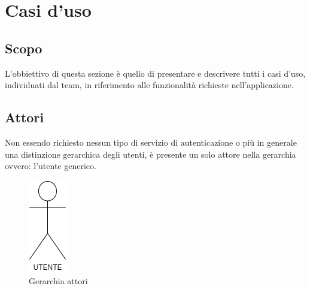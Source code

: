 
\section{Casi d'uso}
\subsection{Scopo}
L'obbiettivo di questa sezione è quello di presentare e descrivere tutti i casi d'uso, individuati dal team, in riferimento alle funzionalità richieste nell'applicazione.
\subsection{Attori}
Non essendo richiesto nessun tipo di servizio di autenticazione o più in generale una distinzione gerarchica degli utenti, è presente un solo attore nella gerarchia ovvero: l'utente generico.
\begin{figure}[h!]
    \centering
    \includegraphics[scale=0.50]{../../assets/Utente.png}
    \caption{Gerarchia attori}
\end{figure}

